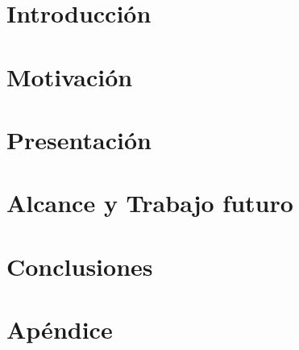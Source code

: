\documentclass[11pt, a4paper, twoside]{article}
\begin{document}
{}



\clearpage{\pagestyle{empty}\clearpage}
\setcounter{page}{1}


\begin{TP}




\section{Introducción}

\section{Motivación}

\section{Presentación}

\section{Alcance y Trabajo futuro}

\section{Conclusiones}

\printbibliography

\section*{Apéndice}


\end{TP}
\end{document}

